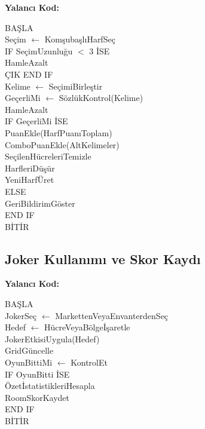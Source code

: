 \documentclass[conference]{IEEEtran}
\begin{document}
\noindent\textbf{Yalancı Kod:}
\begin{flushleft}
\ttfamily
BAŞLA \\
Seçim $\leftarrow$ KomşubaşlıHarfSeç \\
IF SeçimUzunluğu $<$ 3 İSE \\
\hspace*{1em} HamleAzalt \\
\hspace*{1em} ÇIK
END IF \\
Kelime $\leftarrow$ SeçimiBirleştir \\
GeçerliMi $\leftarrow$ SözlükKontrol(Kelime) \\
HamleAzalt \\
IF GeçerliMi İSE \\
\hspace*{1em} PuanEkle(HarfPuanıToplam) \\
\hspace*{1em} ComboPuanEkle(AltKelimeler) \\
\hspace*{1em} SeçilenHücreleriTemizle \\
\hspace*{1em} HarfleriDüşür \\
\hspace*{1em} YeniHarfÜret \\
ELSE \\
\hspace*{1em} GeriBildirimGöster \\
END IF \\
BİTİR
\end{flushleft}
\normalfont

\subsection{Joker Kullanımı ve Skor Kaydı}

\noindent\textbf{Yalancı Kod:}
\begin{flushleft}
\ttfamily
BAŞLA \\
JokerSeç $\leftarrow$ MarkettenVeyaEnvanterdenSeç \\
Hedef $\leftarrow$ HücreVeyaBölgeİşaretle \\
JokerEtkisiUygula(Hedef) \\
GridGüncelle \\
OyunBittiMi $\leftarrow$ KontrolEt \\
IF OyunBitti İSE \\
\hspace*{1em} ÖzetİstatistikleriHesapla \\
\hspace*{1em} RoomSkorKaydet \\
END IF \\
BİTİR
\end{flushleft}
\normalfont
\end{document}
